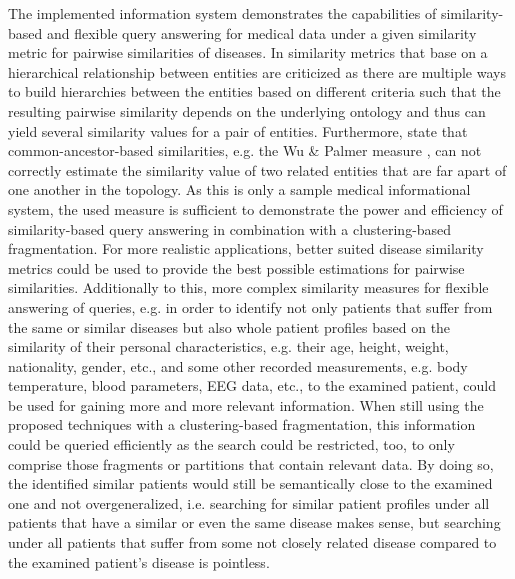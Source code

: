 The implemented information system demonstrates the capabilities of similarity-based and flexible query answering for medical data under a given similarity metric
for pairwise similarities of diseases. In \cite{Mathur2012} similarity metrics that base on a hierarchical relationship between entities are criticized as there
are multiple ways to build hierarchies between the entities based on different criteria such that the resulting pairwise similarity depends on the underlying
ontology and thus can yield several similarity values for a pair of entities. Furthermore, \cite{Mathur2012} state that common-ancestor-based similarities, e.g.
the Wu \& Palmer measure \citep{Wu1994}, can not correctly estimate the similarity value of two related entities that are far apart of one another in the topology.
As this is only a sample medical informational system, the used  measure \citep{McInnes2009} is sufficient to demonstrate the power and 
efficiency of similarity-based query answering in combination with a clustering-based fragmentation. For more realistic applications, better suited disease 
similarity metrics could be used to provide the best possible estimations for pairwise similarities. Additionally to this, more complex similarity measures for
flexible answering of queries, e.g. in order to identify not only patients that suffer from the same or similar diseases but also whole patient profiles based on
the similarity of their personal characteristics, e.g. their age, height, weight, nationality, gender, etc., and some other recorded measurements, e.g. body
temperature, blood parameters, EEG data, etc., to the examined patient, could be used for gaining more and more relevant information. When still using the proposed
techniques with a clustering-based fragmentation, this information could be queried efficiently as the search could be restricted, too, to only comprise those
fragments or partitions that contain relevant data. By doing so, the identified similar patients would still be semantically close to the examined one and not
overgeneralized, i.e. searching for similar patient profiles under all patients that have a similar or even the same disease makes sense, but searching under all
patients that suffer from some not closely related disease compared to the examined patient's disease is pointless.


